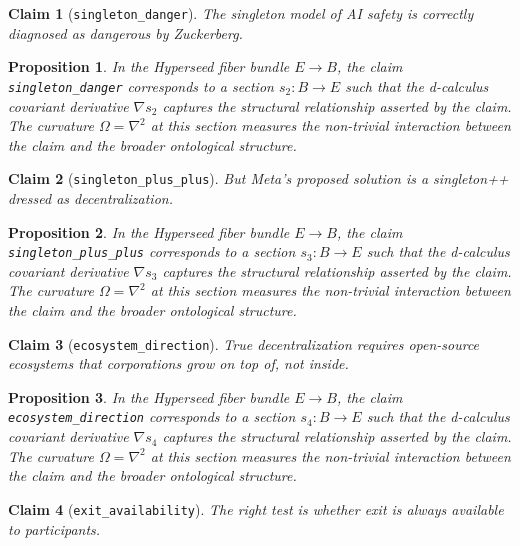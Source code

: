 \documentclass{article}
\newtheorem{claim}{Claim}
\newtheorem{proposition}{Proposition}
\begin{document}
\begin{claim}[\texttt{singleton_danger}]
The singleton model of AI safety is correctly diagnosed as dangerous by Zuckerberg.
\end{claim}

\begin{proposition}
In the Hyperseed fiber bundle $E \to B$, the claim \texttt{singleton_danger} corresponds to a section $s_2: B \to E$ such that the d-calculus covariant derivative $\nabla s_2$ captures the structural relationship asserted by the claim. The curvature $\Omega = \nabla^2$ at this section measures the non-trivial interaction between the claim and the broader ontological structure.
\end{proposition}

\begin{claim}[\texttt{singleton_plus_plus}]
But Meta's proposed solution is a singleton++ dressed as decentralization.
\end{claim}

\begin{proposition}
In the Hyperseed fiber bundle $E \to B$, the claim \texttt{singleton_plus_plus} corresponds to a section $s_3: B \to E$ such that the d-calculus covariant derivative $\nabla s_3$ captures the structural relationship asserted by the claim. The curvature $\Omega = \nabla^2$ at this section measures the non-trivial interaction between the claim and the broader ontological structure.
\end{proposition}

\begin{claim}[\texttt{ecosystem_direction}]
True decentralization requires open-source ecosystems that corporations grow on top of, not inside.
\end{claim}

\begin{proposition}
In the Hyperseed fiber bundle $E \to B$, the claim \texttt{ecosystem_direction} corresponds to a section $s_4: B \to E$ such that the d-calculus covariant derivative $\nabla s_4$ captures the structural relationship asserted by the claim. The curvature $\Omega = \nabla^2$ at this section measures the non-trivial interaction between the claim and the broader ontological structure.
\end{proposition}

\begin{claim}[\texttt{exit_availability}]
The right test is whether exit is always available to participants.
\end{claim}
\end{document}
